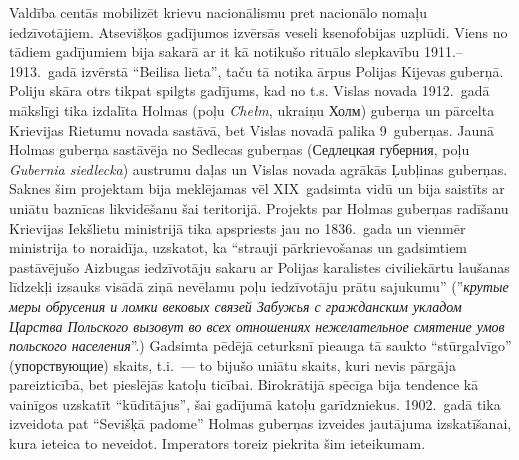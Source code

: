 \documentclass[twoside,a5paper,12pt,fleqn,openany]{extbook}
\newcommand{\pltxti}[1]{\textit{\textpolish{#1}}}
\newcommand{\rutxti}[1]{\textrussian{#1}}
\newcommand{\uktxti}[1]{\textukrainian{#1}}
\begin{document}
Valdība centās mobilizēt krievu nacionālismu pret nacionālo nomaļu iedzīvotājiem. Atsevišķos gadījumos izvērsās veseli ksenofobijas uzplūdi. Viens no tādiem gadījumiem bija sakarā ar it kā notikušo rituālo slepkavību 1911.--1913.~gadā izvērstā ``Beilisa lieta'', taču tā notika ārpus Polijas Kijevas guberņā. Poliju skāra otrs tikpat spilgts gadījums, kad no t.s. Vislas novada 1912.~gadā mākslīgi tika izdalīta Holmas (poļu \pltxti{Chełm}, ukraiņu \uktxti{Холм}) guberņa un pārcelta Krievijas Rietumu novada sastāvā, bet Vislas novadā palika 9~guberņas. Jaunā Holmas guberņa sastāvēja no Sedlecas guberņas (\rutxti{Седлецкая губерния}, poļu \pltxti{Gubernia siedlecka}) austrumu daļas un Vislas novada agrākās Ļubļinas guberņas. Saknes šim projektam bija meklējamas vēl XIX~gadsimta vidū un bija saistīts ar uniātu baznīcas likvidēšanu šai teritorijā. Projekts par Holmas guberņas radīšanu Krievijas Iekšlietu ministrijā tika apspriests jau no 1836.~gada un vienmēr ministrija to noraidīja, uzskatot, ka ``strauji pārkrievošanas un gadsimtiem pastāvējušo Aizbugas iedzīvotāju sakaru ar Polijas karalistes civiliekārtu laušanas līdzekļi izsauks visādā ziņā nevēlamu poļu iedzīvotāju prātu sajukumu'' (''\pltxti{крутые меры обрусения и ломки вековых связей Забужья с гражданским укладом Царства Польского вызовут во всех отношениях нежелательное смятение умов польского населения}''.) Gadsimta pēdējā ceturksnī pieauga tā saukto ``stūrgalvīgo'' (\rutxti{упорствующие}) skaits, t.i.~--- to bijušo uniātu skaits, kuri nevis pārgāja pareizticībā, bet pieslējās katoļu ticībai. Birokrātijā spēcīga bija tendence kā vainīgos uzskatīt ``kūdītājus'', šai gadījumā katoļu garīdzniekus. 1902.~gadā tika izveidota pat ``Sevišķā padome'' Holmas guberņas izveides jautājuma izskatīšanai, kura ieteica to neveidot. Imperators toreiz piekrita šim ieteikumam.
\end{document}
